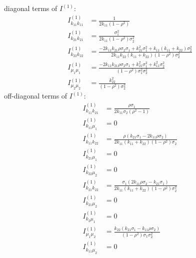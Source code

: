 \documentclass[11pt]{article}%
\theoremstyle{definition}
\begin{document}
diagonal terms of $I^{\left(  1\right)  }$:%
\begin{align}
I_{k_{11}k_{11}}^{\left(  1\right)  }  &  =\frac{1}{2k_{11}\left(  1-\rho
^{2}\right)  }\label{fisher_info_alpha}\\
I_{k_{21}k_{21}}^{\left(  1\right)  }  &  =\frac{\sigma_{1}^{2}}%
{2k_{11}\left(  1-\rho^{2}\right)  \sigma_{2}^{2}}\nonumber\\
I_{k_{22}k_{22}}^{\left(  1\right)  }  &  =\frac{-2k_{11}k_{21}\rho\sigma
_{2}\sigma_{1}+k_{21}^{2}\sigma_{1}^{2}+k_{11}\left(  k_{11}+k_{22}\right)
\sigma_{2}^{2}}{2k_{11}k_{22}\left(  k_{11}+k_{22}\right)  \left(  1-\rho
^{2}\right)  \sigma_{2}^{2}}\nonumber\\
I_{\mu_{1}\mu_{1}}^{\left(  1\right)  }  &  =\frac{-2k_{11}k_{21}\rho
\sigma_{2}\sigma_{1}+k_{21}^{2}\sigma_{1}^{2}+k_{11}^{2}\sigma_{2}^{2}%
}{\left(  1-\rho^{2}\right)  \sigma_{1}^{2}\sigma_{2}^{2}}\nonumber\\
I_{\mu_{2}\mu_{2}}^{\left(  1\right)  }  &  =\frac{k_{22}^{2}}{\left(
1-\rho^{2}\right)  \sigma_{2}^{2}}\nonumber
\end{align}
off-diagonal terms of $I^{\left(  1\right)  }$:%
\begin{align*}
I_{k_{11}k_{21}}^{\left(  1\right)  }  &  =\frac{\rho\sigma_{1}}{2k_{11}%
\sigma_{2}\left(  \rho^{2}-1\right)  }\\
I_{k_{11}\mu_{1}}^{\left(  1\right)  }  &  =0\\
I_{k_{11}k_{22}}^{\left(  1\right)  }  &  =\frac{\rho\left(  k_{21}\sigma
_{1}-2k_{11}\rho\sigma_{2}\right)  }{2k_{11}\left(  k_{11}+k_{22}\right)
\left(  1-\rho^{2}\right)  \sigma_{2}}\\
I_{k_{21}\mu_{1}}^{\left(  1\right)  }  &  =0\\
I_{k_{22}\mu_{2}}^{\left(  1\right)  }  &  =0\\
I_{k_{21}k_{22}}^{\left(  1\right)  }  &  =\frac{\sigma_{1}\left(  2k_{11}%
\rho\sigma_{2}-k_{21}\sigma_{1}\right)  }{2k_{11}\left(  k_{11}+k_{22}\right)
\left(  1-\rho^{2}\right)  \sigma_{2}^{2}}\\
I_{k_{21}\mu_{2}}^{\left(  1\right)  }  &  =0\\
I_{k_{2}\mu_{1}}^{\left(  1\right)  }  &  =0\\
I_{\mu_{1}\mu_{2}}^{\left(  1\right)  }  &  =\frac{k_{22}\left(  k_{21}%
\sigma_{1}-k_{11}\rho\sigma_{2}\right)  }{\left(  1-\rho^{2}\right)
\sigma_{1}\sigma_{2}^{2}}\\
I_{k_{11}\mu_{2}}^{\left(  1\right)  }  &  =0
\end{align*}
\end{document}
